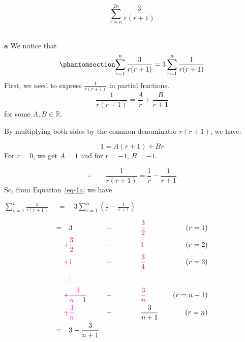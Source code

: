 \documentclass[
  a4paper,
]{report}
\begin{document}
\[\sum_{r = n}^{2n}{\frac{3}{r(r + 1)}}\]\\

\begin{tcolorbox}[enhanced jigsaw, title={Solution}, titlerule=0mm, colbacktitle=quarto-callout-tip-color!10!white, coltitle=black, toprule=.15mm, colframe=quarto-callout-tip-color-frame, breakable, bottomtitle=1mm, toptitle=1mm, arc=.35mm, rightrule=.15mm, bottomrule=.15mm, left=2mm, opacitybacktitle=0.6, leftrule=.75mm, opacityback=0, colback=white]

\textbf{a} We notice that
\begin{equation}\phantomsection\label{eq-1a}{\sum_{r=1}^{n}\frac{3}{r(r+1)}=3\sum_{r=1}^{n}\frac{1}{r(r+1)}}\end{equation}
First, we need to express \(\frac{1}{r(r+1)}\) in partial fractions. \[
\frac{1}{r(r+1)}=\frac{A}{r}+\frac{B}{r+1}\] for some
\(A,B \in \mathbb{R}\).

By multiplying both sides by the common denominator \(r(r+1)\), we have:

\[1=A(r+1)+Br \] For \(r=0\), we get \(A=1\) and for \(r=-1\), \(B=-1\).

\[\therefore \qquad \frac{1}{r(r+1)}=\frac{1}{r}-\frac{1}{r+1} \] So,
from Equation~\ref{eq-1a} we have

\(\sum_{r=1}^{n}\frac{3}{r(r+1)} \ \quad  = \quad 3\sum_{r=1}^{n} \left(\frac{1}{r}-\frac{1}{r+1}\right)\)

\begin{alignat*}{3}
= \quad & 3 & \textcolor{magenta}{-} \qquad & \qquad  \textcolor{magenta}{\frac{3}{2}}  & \quad (r=1) \\
\textcolor{magenta}{+}  & \textcolor{magenta}{\frac{3}{2}}  &\textcolor{magenta}{-} \qquad& \qquad \textcolor{magenta}{ 1} & \quad (r=2) \\
\textcolor{magenta}{+} &\textcolor{magenta}{1} &\textcolor{magenta}{-} \qquad& \qquad  \textcolor{magenta}{\frac{3}{4}} & \quad (r=3) \\
&\textcolor{magenta}{\vdots} & & \quad & \\
\textcolor{magenta}{+}  & \textcolor{magenta}{\frac{3}{n-1}}  &\textcolor{magenta}{-} \qquad& \qquad  \textcolor{magenta}{\frac{3}{n}}  & \quad (r=n-1)\\
\textcolor{magenta}{+} & \textcolor{magenta}{\frac{3}{n}} & - \qquad & \qquad \frac{3}{n+1} & \quad (r=n)\\
= \quad & 3 - \frac{3}{n+1} & & \quad & 
\end{alignat*}


\end{tcolorbox}
\end{document}
